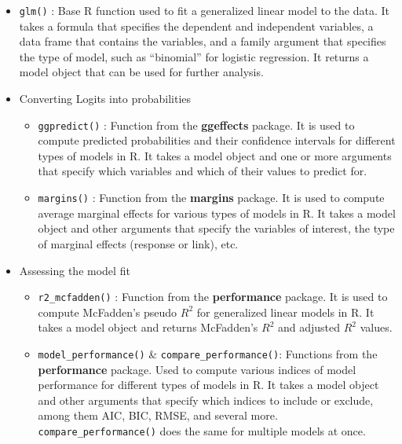 \documentclass[
]{book}
\providecommand{\tightlist}{%
  \setlength{\itemsep}{0pt}\setlength{\parskip}{0pt}}
\begin{document}
\begin{itemize}
\tightlist
\item
  \texttt{glm()} : Base R function used to fit a generalized linear model to
  the data. It takes a formula that specifies the dependent and
  independent variables, a data frame that contains the variables, and
  a family argument that specifies the type of model, such as ``binomial''
  for logistic regression. It returns a model object that can be used
  for further analysis.
\item
  Converting Logits into probabilities

  \begin{itemize}
  \tightlist
  \item
    \texttt{ggpredict()} : Function from the \textbf{ggeffects} package. It
    is used to compute predicted probabilities and their confidence intervals
    for different types of models in R. It takes a model object and one or
    more arguments that specify which variables and which of their values
    to predict for.
  \item
    \texttt{margins()} : Function from the \textbf{margins} package. It is
    used to compute average marginal effects for various types of models in R.
    It takes a model object and other arguments that specify the
    variables of interest, the type of marginal effects (response or
    link), etc.
  \end{itemize}
\item
  Assessing the model fit

  \begin{itemize}
  \tightlist
  \item
    \texttt{r2\_mcfadden()} : Function from the \textbf{performance} package.
    It is used to compute McFadden's pseudo \(R^2\) for generalized
    linear models in R. It takes a model object and returns McFadden's \(R^2\)
    and adjusted \(R^2\) values.
  \item
    \texttt{model\_performance()} \& \texttt{compare\_performance()}: Functions from the
    \textbf{performance} package. Used to compute various indices of model
    performance for different types of models in R. It takes a model object and
    other arguments that specify which indices to include or exclude, among them
    AIC, BIC, RMSE, and several more. \texttt{compare\_performance()} does the same for
    multiple models at once.
  \end{itemize}
\end{itemize}
\end{document}
